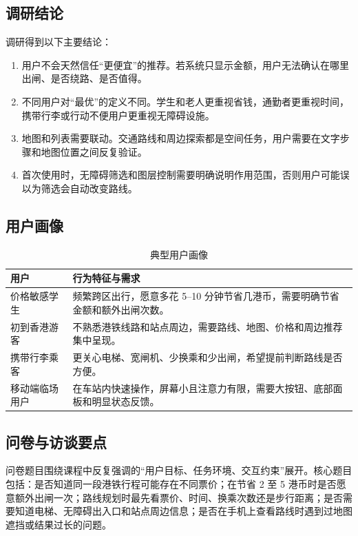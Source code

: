 \documentclass[UTF8,a4paper,11pt]{ctexart}
\begin{document}
\subsection{调研结论}

调研得到以下主要结论：
\begin{enumerate}
  \item 用户不会天然信任“更便宜”的推荐。若系统只显示金额，用户无法确认在哪里出闸、是否绕路、是否值得。
  \item 不同用户对“最优”的定义不同。学生和老人更重视省钱，通勤者更重视时间，携带行李或行动不便用户更重视无障碍设施。
  \item 地图和列表需要联动。交通路线和周边探索都是空间任务，用户需要在文字步骤和地图位置之间反复验证。
  \item 首次使用时，无障碍筛选和图层控制需要明确说明作用范围，否则用户可能误以为筛选会自动改变路线。
\end{enumerate}

\subsection{用户画像}

\begin{table}[H]
  \centering
  \caption{典型用户画像}
  \begin{tabularx}{\textwidth}{lY}
    \toprule
    用户 & 行为特征与需求 \\
    \midrule
    价格敏感学生 & 频繁跨区出行，愿意多花 5--10 分钟节省几港币，需要明确节省金额和额外出闸次数。 \\
    初到香港游客 & 不熟悉港铁线路和站点周边，需要路线、地图、价格和周边推荐集中呈现。 \\
    携带行李乘客 & 更关心电梯、宽闸机、少换乘和少出闸，希望提前判断路线是否方便。 \\
    移动端临场用户 & 在车站内快速操作，屏幕小且注意力有限，需要大按钮、底部面板和明显状态反馈。 \\
    \bottomrule
  \end{tabularx}
\end{table}

\subsection{问卷与访谈要点}

问卷题目围绕课程中反复强调的“用户目标、任务环境、交互约束”展开。核心题目包括：是否知道同一段港铁行程可能存在不同票价；在节省 2 至 5 港币时是否愿意额外出闸一次；路线规划时最先看票价、时间、换乘次数还是步行距离；是否需要知道电梯、无障碍出入口和站点周边信息；是否在手机上查看路线时遇到过地图遮挡或结果过长的问题。
\end{document}
